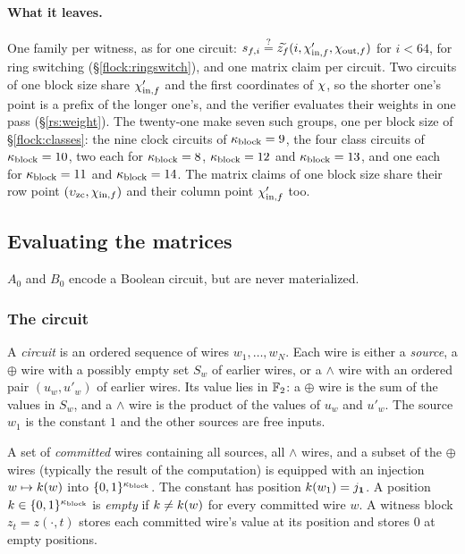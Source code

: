 \paragraph{What it leaves.} One family per witness, as for one circuit: $s_{f,i}\stackrel{?}{=}\widetilde{z_f}(i,\chi'_{\mathrm{in},f},\chi_{\mathrm{out},f})$ for $i<64$, for ring switching (\S\ref{flock:ringswitch}), and one matrix claim per circuit. Two circuits of one block size share $\chi'_{\mathrm{in},f}$ and the first coordinates of $\chi$, so the shorter one's point is a prefix of the longer one's, and the verifier evaluates their weights in one pass (\S\ref{rs:weight}). The twenty-one make seven such groups, one per block size of \S\ref{flock:classes}: the nine clock circuits of $\kappa_{\mathrm{block}}=9$, the four class circuits of $\kappa_{\mathrm{block}}=10$, two each for $\kappa_{\mathrm{block}}=8$, $\kappa_{\mathrm{block}}=12$ and $\kappa_{\mathrm{block}}=13$, and one each for $\kappa_{\mathrm{block}}=11$ and $\kappa_{\mathrm{block}}=14$. The matrix claims of one block size share their row point $(\upsilon_{\mathrm{zc}},\chi_{\mathrm{in},f})$ and their column point $\chi'_{\mathrm{in},f}$ too.

\subsection{Evaluating the matrices}\label{flock:matrices}

$A_0$ and $B_0$ encode a Boolean circuit, but are never materialized.

\subsubsection{The circuit}\label{flock:circuit}

\begin{definition}[Circuit]\label{def:circuit}
A \emph{circuit} is an ordered sequence of wires $w_1,\ldots,w_N$. Each wire is either a \emph{source}, a $\oplus$ wire with a possibly empty set $S_w$ of earlier wires, or a $\wedge$ wire with an ordered pair $(u_w,u'_w)$ of earlier wires. Its value lies in $\mathbb{F}_2$: a $\oplus$ wire is the sum of the values in $S_w$, and a $\wedge$ wire is the product of the values of $u_w$ and $u'_w$. The source $w_1$ is the constant $1$ and the other sources are free inputs.

A set of \emph{committed} wires containing all sources, all $\wedge$ wires, and a subset of the $\oplus$ wires (typically the result of the computation) is equipped with an injection $w\mapsto k(w)$ into $\{0,1\}^{\kappa_{\mathrm{block}}}$. The constant has position $k(w_1)=j_{\mathbf{1}}$. A position $k\in\{0,1\}^{\kappa_{\mathrm{block}}}$ is \emph{empty} if $k\neq k(w)$ for every committed wire $w$. A witness block $z_t=z(\cdot,t)$ stores each committed wire's value at its position and stores $0$ at empty positions.
\end{definition}

